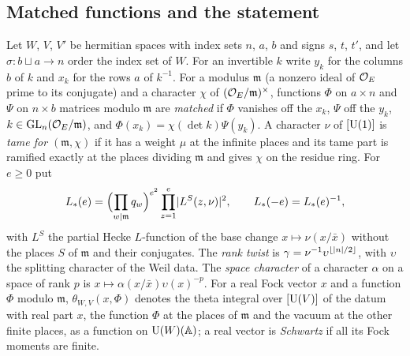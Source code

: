 \subsection{Matched functions and the statement}\label{ss:exchange-statement}
Let $W$, $V$, $V'$ be hermitian spaces with index sets $n$, $a$, $b$ and signs $s$, $t$, $t'$, and let $\sigma\colon b\sqcup a\to n$ order the index set of $W$. For an invertible $k$ write
$y_k$ for the columns $b$ of $k$ and $x_k$ for the rows $a$ of $k^{-1}$. For a modulus $\mathfrak m$ (a nonzero ideal of $\mathcal{O}_E$ prime to its conjugate) and a character $\chi$ of
$(\mathcal{O}_E/\mathfrak m)^\times$, functions $\Phi$ on $a\times n$ and $\Psi$ on $n\times b$ matrices modulo $\mathfrak m$ are \emph{matched} if $\Phi$ vanishes off the $x_k$, $\Psi$ off the $y_k$, $k\in\operatorname{GL}_n(\mathcal{O}_E/\mathfrak m)$,
and $\Phi(x_k)=\chi(\det k)\Psi(y_k)$. A character $\nu$ of $[\operatorname{U}(1)]$ is \emph{tame for $(\mathfrak m,\chi)$} if it has a weight $\mu$ at the infinite places and its tame part is ramified
exactly at the places dividing $\mathfrak m$ and gives $\chi$ on the residue ring. For $e\ge0$ put
\[
  L_*(e)=\Bigl(\prod_{w\mid\mathfrak m}q_w\Bigr)^{e^2}\prod_{z=1}^{e}\lvert L^S(z,\nu)\rvert^2,\qquad L_*(-e)=L_*(e)^{-1},
\]
with $L^S$ the partial Hecke $L$-function of the base change $x\mapsto\nu(x/\bar x)$ without the places $S$ of $\mathfrak m$ and their conjugates. The \emph{rank twist} is
$\gamma=\nu^{-1}\upsilon^{\lfloor\lvert n\rvert/2\rfloor}$, with $\upsilon$ the splitting character of the Weil data. The \emph{space character} of a character $\alpha$ on a space of rank $p$ is
$x\mapsto\alpha(x/\bar x)\upsilon(x)^{-p}$. For a real Fock vector $x$ and a function $\Phi$ modulo $\mathfrak m$, $\theta_{W,V}(x,\Phi)$ denotes the theta integral over $[\operatorname{U}(V)]$ of the datum with real
part $x$, the function $\Phi$ at the places of $\mathfrak m$ and the vacuum at the other finite places, as a function on $\operatorname{U}(W)(\mathbb{A})$; a real vector is \emph{Schwartz} if all its Fock moments are
finite.

